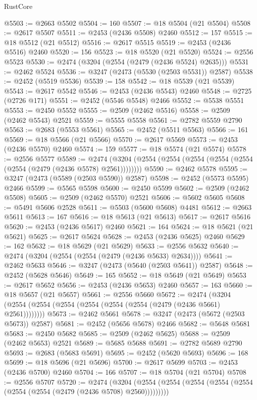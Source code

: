 \begin{lexlean}{RustCore}
\begin{coremodule}
@5503 := @2663 @5502
@5504 := 160
@5507 := @18 @5504 (@21 @5504)
@5508 := @2617 @5507
@5511 := @2453 (@2436 @5508) @2460
@5512 := 157
@5515 := @18 @5512 (@21 @5512)
@5516 := @2617 @5515
@5519 := @2453 (@2436 @5516) @2460
@5520 := 156
@5523 := @18 @5520 (@21 @5520)
@5524 := @2556 @5523
@5530 := @2474 (@3204 (@2554 (@2479 (@2436 @5524) @2635)))
@5531 := @2462 @5524
@5536 := @3247 (@2473 (@5530 (@2503 @5531)) @2587)
@5538 := @2452 (@5519 @5536)
@5539 := 158
@5542 := @18 @5539 (@21 @5539)
@5543 := @2617 @5542
@5546 := @2453 (@2436 @5543) @2460
@5548 := @2725 (@2726 @171)
@5551 := @2452 (@5546 @5548) @2466
@5552 := @5538 @5551
@5553 := @2450 @5552
@5555 := @2509 (@2462 @5516)
@5558 := @2509 (@2462 @5543) @2521
@5559 := @5555 @5558
@5561 := @2782 @5559 @2790
@5563 := @2683 (@5553 @5561)
@5565 := @2452 (@5511 @5563)
@5566 := 161
@5569 := @18 @5566 (@21 @5566)
@5570 := @2617 @5569
@5573 := @2453 (@2436 @5570) @2460
@5574 := 159
@5577 := @18 @5574 (@21 @5574)
@5578 := @2556 @5577
@5589 := @2474 (@3204 (@2554 (@2554 (@2554 (@2554 (@2554 (@2554 (@2479 (@2436 @5578) @2561))))))))
@5590 := @2462 @5578
@5595 := @3247 (@2473 (@5589 (@2503 @5590)) @2587)
@5598 := @2452 (@5573 @5595) @2466
@5599 := @5565 @5598
@5600 := @2450 @5599
@5602 := @2509 (@2462 @5508)
@5605 := @2509 (@2462 @5570) @2521
@5606 := @5602 @5605
@5608 := @5491 @5606 @2528
@5611 := @5503 (@5600 @5608) @4481
@5612 := @2663 @5611
@5613 := 167
@5616 := @18 @5613 (@21 @5613)
@5617 := @2617 @5616
@5620 := @2453 (@2436 @5617) @2460
@5621 := 164
@5624 := @18 @5621 (@21 @5621)
@5625 := @2617 @5624
@5628 := @2453 (@2436 @5625) @2460
@5629 := 162
@5632 := @18 @5629 (@21 @5629)
@5633 := @2556 @5632
@5640 := @2474 (@3204 (@2554 (@2554 (@2479 (@2436 @5633) @2634))))
@5641 := @2462 @5633
@5646 := @3247 (@2473 (@5640 (@2503 @5641)) @2587)
@5648 := @2452 (@5628 @5646)
@5649 := 165
@5652 := @18 @5649 (@21 @5649)
@5653 := @2617 @5652
@5656 := @2453 (@2436 @5653) @2460
@5657 := 163
@5660 := @18 @5657 (@21 @5657)
@5661 := @2556 @5660
@5672 := @2474 (@3204 (@2554 (@2554 (@2554 (@2554 (@2554 (@2554 (@2479 (@2436 @5661) @2561))))))))
@5673 := @2462 @5661
@5678 := @3247 (@2473 (@5672 (@2503 @5673)) @2587)
@5681 := @2452 (@5656 @5678) @2466
@5682 := @5648 @5681
@5683 := @2450 @5682
@5685 := @2509 (@2462 @5625)
@5688 := @2509 (@2462 @5653) @2521
@5689 := @5685 @5688
@5691 := @2782 @5689 @2790
@5693 := @2683 (@5683 @5691)
@5695 := @2452 (@5620 @5693)
@5696 := 168
@5699 := @18 @5696 (@21 @5696)
@5700 := @2617 @5699
@5703 := @2453 (@2436 @5700) @2460
@5704 := 166
@5707 := @18 @5704 (@21 @5704)
@5708 := @2556 @5707
@5720 := @2474
    (@3204 (@2554 (@2554 (@2554 (@2554 (@2554 (@2554 (@2554 (@2479 (@2436 @5708) @2560)))))))))

\end{coremodule}
\end{lexlean}
